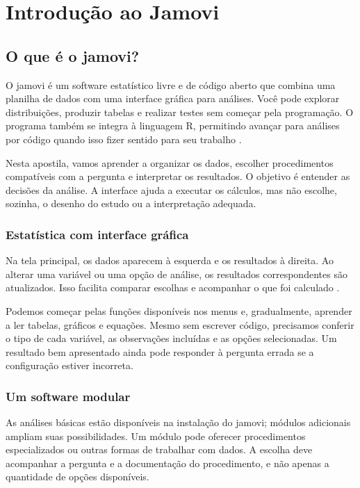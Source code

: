 \chapter{Introdução ao Jamovi}

\section{O que é o jamovi?}

O jamovi é um software estatístico livre e de código aberto que combina uma planilha de dados com uma interface gráfica para análises. Você pode explorar distribuições, produzir tabelas e realizar testes sem começar pela programação. O programa também se integra à linguagem R, permitindo avançar para análises por código quando isso fizer sentido para seu trabalho \parencite{Jamovi2022,JamoviR}.

Nesta apostila, vamos aprender a organizar os dados, escolher procedimentos compatíveis com a pergunta e interpretar os resultados. O objetivo é entender as decisões da análise. A interface ajuda a executar os cálculos, mas não escolhe, sozinha, o desenho do estudo ou a interpretação adequada.

\subsection{Estatística com interface gráfica}

Na tela principal, os dados aparecem à esquerda e os resultados à direita. Ao alterar uma variável ou uma opção de análise, os resultados correspondentes são atualizados. Isso facilita comparar escolhas e acompanhar o que foi calculado \parencite{JamoviPrimeirosPassos}.

Podemos começar pelas funções disponíveis nos menus e, gradualmente, aprender a ler tabelas, gráficos e equações. Mesmo sem escrever código, precisamos conferir o tipo de cada variável, as observações incluídas e as opções selecionadas. Um resultado bem apresentado ainda pode responder à pergunta errada se a configuração estiver incorreta.

\subsection{Um software modular}

As análises básicas estão disponíveis na instalação do jamovi; módulos adicionais ampliam suas possibilidades. Um módulo pode oferecer procedimentos especializados ou outras formas de trabalhar com dados. A escolha deve acompanhar a pergunta e a documentação do procedimento, e não apenas a quantidade de opções disponíveis.

